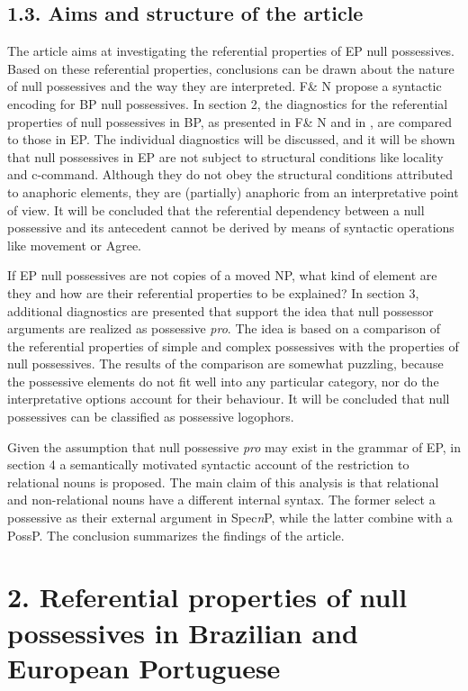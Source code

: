 \documentclass[output=paper]{langsci/langscibook}
\begin{document}
\subsection{ 1.3. Aims and structure of the article}

The article aims at investigating the referential properties of EP null possessives. Based on these referential properties, conclusions can be drawn about the nature of null possessives and the way they are interpreted. F\& N propose a syntactic encoding for BP null possessives. In section 2, the diagnostics for the referential properties of null possessives in BP, as presented in F\& N and in \citet{Rodrigues2010}, are compared to those in EP. The individual diagnostics will be discussed, and it will be shown that null possessives in EP are not subject to structural conditions like locality and c-command. Although they do not obey the structural conditions attributed to anaphoric elements, they are (partially) anaphoric from an interpretative point of view. It will be concluded that the referential dependency between a null possessive and its antecedent cannot be derived by means of syntactic operations like movement or Agree.

If EP null possessives are not copies of a moved NP, what kind of element are they and how are their referential properties to be explained? In section 3, additional diagnostics are presented that support the idea that null possessor arguments are realized as possessive \textit{pro}. The idea is based on a comparison of the referential properties of simple and complex possessives with the properties of null possessives. The results of the comparison are somewhat puzzling, because the possessive elements do not fit well into any particular category, nor do the interpretative options account for their behaviour. It will be concluded that null possessives can be classified as possessive logophors.

Given the assumption that null possessive \textit{pro} may exist in the grammar of EP, in section 4 a semantically motivated syntactic account of the restriction to relational nouns is proposed. The main claim of this analysis is that relational and non-relational nouns have a different internal syntax. The former select a possessive as their external argument in Spec\textit{n}P, while the latter combine with a PossP. The conclusion summarizes the findings of the article.

\section{ 2. Referential properties of null possessives in Brazilian and European Portuguese}
\end{document}
